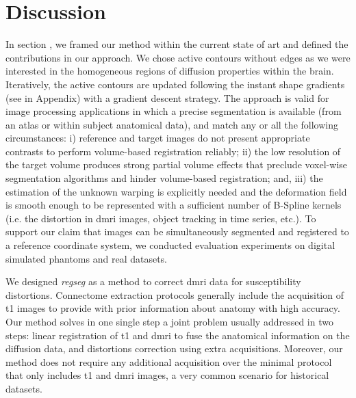\section*{Discussion}
\label{sec:discussion}
In section , we framed our method within the current
  state of art and defined the contributions in our approach.
We chose active contours without edges as we were interested in the homogeneous
  regions of diffusion properties within the brain.
Iteratively, the active contours are updated following the instant shape gradients
  (see  in Appendix) with a gradient descent strategy.
The approach is valid for image processing applications in which a precise segmentation is
  available (from an atlas or within subject anatomical data), and match any or all
  the following circumstances:
  i) reference and target images do not present appropriate contrasts to
  	perform volume-based registration reliably;
  ii) the low resolution of the target volume produces strong partial volume effects
  	that preclude voxel-wise segmentation algorithms and hinder volume-based
  	registration; and,
  iii) the estimation of the unknown warping is explicitly needed and the
    deformation field is smooth enough to be represented with a sufficient number
  	of B-Spline kernels (i.e. the distortion in \gls*{dmri} images,
  	object tracking in time series, etc.).
To support our claim that images can be simultaneously segmented and registered to a
  reference coordinate system, we conducted evaluation experiments on digital
  simulated phantoms and real datasets.

We designed \emph{regseg} as a method to correct \gls*{dmri} data for susceptibility
  distortions.
Connectome extraction protocols generally include the acquisition of \gls*{t1} images
  to provide with prior information about anatomy with high accuracy.
Our method solves in one single step a joint problem usually addressed in two steps:
  linear registration of \gls*{t1} and \gls*{dmri} to fuse the anatomical information on
  the diffusion data, and distortions correction using extra acquisitions.
Moreover, our method does not require any additional acquisition over the minimal protocol
  that only includes \gls*{t1} and \gls*{dmri} images, a very common scenario for
  historical datasets.

